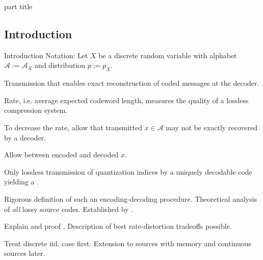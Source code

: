 \begin{frame}
 \vspace{8.0ex}
\begin{center}
\begin{beamercolorbox}[sep=12pt,center]{part title}
\insertsection\par
\end{beamercolorbox}
\end{center}
\end{frame}

\subsection{Introduction}

\begin{frame}{Introduction}
Notation: Let $X$ be a discrete random variable with alphabet $\mathcal{A}:=\mathcal{A}_X$ and distribution $p:=p_X$.

\bit
\item Transmission that enables exact reconstruction of coded messages at the decoder.  
\item Rate, i.e. average expected codeword length, measures the quality of a lossless compression system. 
\eit
{} 
\bit 
\item  To decrease the rate, allow that transmitted $x\in\mathcal{A}$ may not 
be exactly recovered by a decoder.
\item Allow  between encoded and decoded $x$. 
\item Only lossless transmission of quantization indices by a uniquely decodable code yielding a . 
\item[\iarrow]  Rigorous definition of such an encoding-decoding procedure. 
\eit
{} Theoretical analysis of \textit{all} lossy source codes. Established by .  
\bit
\item {} Explain and proof . Description 
of best rate-distortion tradeoffs possible.    
\item Treat discrete iid. case first. Extension to sources with memory and continuous sources later. 
\eit
\end{frame}

